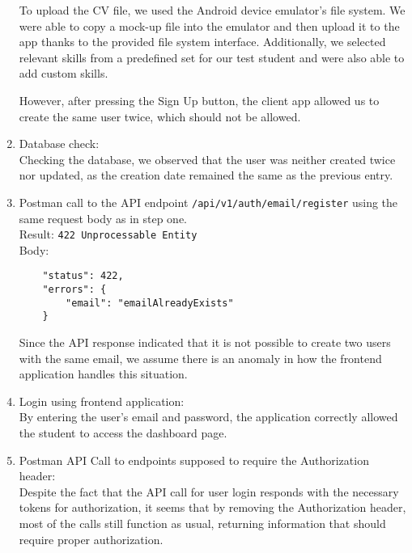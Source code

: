 \begin{enumerate}
    To upload the CV file, we used the Android device emulator's file system. We were able to copy a mock-up file into the emulator and then upload it to the app thanks to the provided file system interface. Additionally, we selected relevant skills from a predefined set for our test student and were also able to add custom skills.

    However, after pressing the Sign Up button, the client app allowed us to create the same user twice, which should not be allowed.
    
    \item Database check:\\
    Checking the database, we observed that the user was neither created twice nor updated, as the creation date remained the same as the previous entry.
    \item Postman call to the API endpoint \verb|/api/v1/auth/email/register| using the same request body as in step one.\\
    Result: \verb|422 Unprocessable Entity|\\
    Body: 
    \begin{verbatim}
    "status": 422,
    "errors": {
        "email": "emailAlreadyExists"
    }
    \end{verbatim}
   Since the API response indicated that it is not possible to create two users with the same email, we assume there is an anomaly in how the frontend application handles this situation.
    
    \item Login using frontend application:\\
    By entering the user’s email and password, the application correctly allowed the student to access the dashboard page.

    \item Postman API Call to endpoints supposed to require the Authorization header:\\
    Despite the fact that the API call for user login responds with the necessary tokens for authorization, it seems that by removing the Authorization header, most of the calls still function as usual, returning information that should require proper authorization.
    
\end{enumerate}

